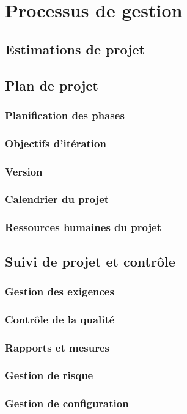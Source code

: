 
\section{Processus de gestion}
\subsection{Estimations de projet}

\subsection{Plan de projet}
\subsubsection{Planification des phases}
\subsubsection{Objectifs d’itération}
\subsubsection{Version}
\subsubsection{Calendrier du projet}
\subsubsection{Ressources humaines du projet}

\subsection{Suivi de projet et contrôle}
\subsubsection{Gestion des exigences}
\subsubsection{Contrôle de la qualité}
\subsubsection{Rapports et mesures}
\subsubsection{Gestion de risque}
\subsubsection{Gestion de configuration}
